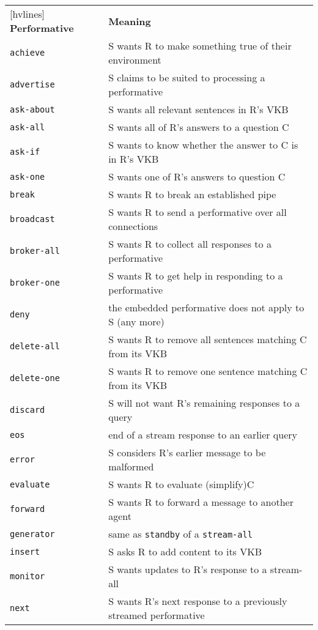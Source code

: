 \begin{table}[!h]
\centering
\begin{NiceTabular}{ll}[hvlines]
\textbf{Performative} & \textbf{Meaning}\\
\texttt{achieve}&S wants R to make something true of their environment\\
\texttt{advertise}&S claims to be suited to processing a performative\\
\texttt{ask-about}&S wants all relevant sentences in R’s VKB\\
\texttt{ask-all}&S wants all of R’s answers to a question C\\
\texttt{ask-if}&S wants to know whether the answer to C is in R’s VKB\\
\texttt{ask-one}&S wants one of R’s answers to question C\\
\texttt{break}&S wants R to break an established pipe\\
\texttt{broadcast}&S wants R to send a performative over all connections\\
\texttt{broker-all}&S wants R to collect all responses to a performative\\
\texttt{broker-one}&S wants R to get help in responding to a performative\\
\texttt{deny}&the embedded performative does not apply to S (any more)\\
\texttt{delete-all}&S wants R to remove all sentences matching C from its VKB\\
\texttt{delete-one}&S wants R to remove one sentence matching C from its VKB\\
\texttt{discard}&S will not want R’s remaining responses to a query\\
\texttt{eos}&end of a stream response to an earlier query\\
\texttt{error}&S considers R’s earlier message to be malformed\\
\texttt{evaluate}&S wants R to evaluate (simplify)C\\
\texttt{forward}&S wants R to forward a message to another agent\\
\texttt{generator}&same as \texttt{standby} of a \texttt{stream-all}\\
\texttt{insert}&S asks R to add content to its VKB\\
\texttt{monitor}&S wants updates to R’s response to a stream-all\\
\texttt{next}&S wants R’s next response to a previously streamed performative\\

\end{NiceTabular}
\end{table}
